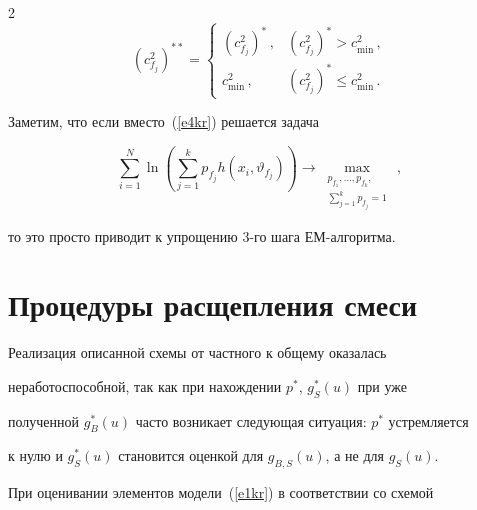 \begin{multicols}{2}
\begin{equation*}
\left ( c^2_{f_j}\right )^{**} = 


\begin{cases}


\left ( c^2_{f_j}\right )^*\,, & \left ( c_{f_j}^2\right )^* > c^2_{\min}\,,\\


 c^2_{\min}\,, & \left ( c_{f_j}^2\right )^* \leq c^2_{\min}\,.


\end{cases}


     \end{equation*}


     


     Заметим, что если вместо~(\ref{e4kr}) решается задача


     \begin{equation*}


     \sum\limits_{i=1}^N\ln \left ( \sum\limits_{j=1}^k p_{f_j} h\left (x_i, 


\vartheta_{f_j}\right )\right ) \rightarrow \underset{\substack{{p_{f_1},\ldots 


,p_{f_k},}\\{\sum\limits_{j=1}^k p_{f_j}=1}}}{\max}\,,




     \end{equation*}


то это просто приводит к упрощению 3-го шага ЕМ-алгоритма.





\section{Процедуры расщепления смеси}





     Реализация описанной схемы от частного к общему оказалась 


неработоспособной, так как при нахождении $p^*$, $g_S^*(u)$ при уже 


полученной $g_B^*(u)$ часто возникает следующая ситуация: $p^*$ устремляется 


к нулю и $g_S^*(u)$ становится оценкой для $g_{B,S}(u)$, а не для $g_S(u)$.


     


     При оценивании элементов модели~(\ref{e1kr}) в соответствии со схемой 



\end{multicols}
